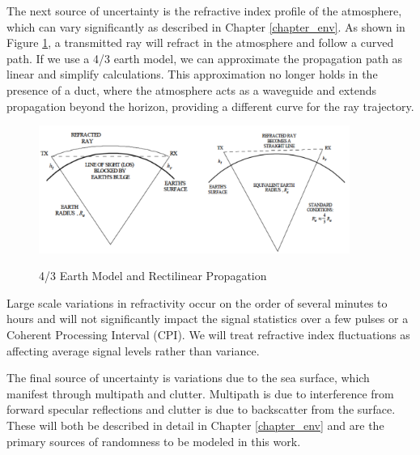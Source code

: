 The next source of uncertainty is the refractive index profile of the atmosphere, which can vary significantly as described in Chapter \ref{chapter_env}. As shown in Figure \ref{rmt_fig:2}, a transmitted ray will refract in the atmosphere and follow a curved path. If we use a 4/3 earth model, we can approximate the propagation path as linear and simplify calculations. This approximation no longer holds in the presence of a duct, where the atmosphere acts as a waveguide and extends propagation beyond the horizon, providing a different curve for the ray trajectory.
\begin{figure}[H]
  \begin{center}
\includegraphics[width=4in]{../media/multistatic/earth_refractivity.png}
  \end{center}
  \renewcommand{\baselinestretch}{1} \small\normalsize
  \begin{quote}
    \caption[4/3 Earth Model and Rectilinear Propagation]{4/3 Earth Model and Rectilinear Propagation\label{rmt_fig:2}}
  \end{quote}
\end{figure}
\renewcommand{\baselinestretch}{2} \small\normalsize
Large scale variations in refractivity occur on the order of several minutes to hours and will not significantly impact the signal statistics over a few pulses or a Coherent Processing Interval (CPI). We will treat refractive index fluctuations as affecting average signal levels rather than variance.

The final source of uncertainty is variations due to the sea surface, which manifest through multipath and clutter. Multipath is due to interference from forward specular reflections and clutter is due to backscatter from the surface. These will both be described in detail in Chapter \ref{chapter_env} and are the primary sources of randomness to be modeled in this work. 
